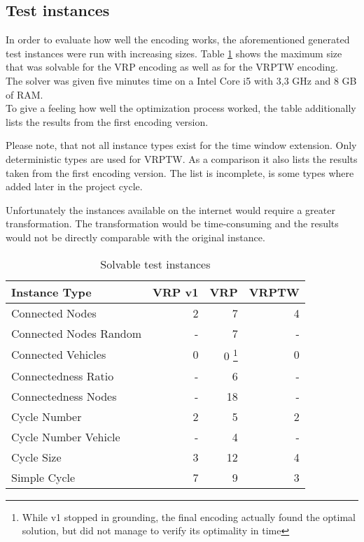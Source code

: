 \documentclass[12pt, letterpaper]{article}
\begin{document}
\subsection{Test instances}
In order to evaluate how well the encoding works, the aforementioned generated test instances were run with increasing sizes. Table \ref{table:benchmark} shows the maximum size that was solvable for the VRP encoding as well as for the VRPTW encoding.\\
The solver was given five minutes time on a Intel Core i5 with 3,3 GHz and 8 GB of RAM.\\
To give a feeling how well the optimization process worked, the table additionally lists the results from the first encoding version.

Please note, that not all instance types exist for the time window extension. Only deterministic types are used for VRPTW.
As a comparison it also lists the results taken from the first encoding version. The list is incomplete, is some types where added later in the project cycle.

Unfortunately the instances available on the internet would require a greater transformation. The transformation would be time-consuming and the results would not be directly comparable with the original instance.

\begin{table}
\begin{tabular}{l | r | r | r}
Instance Type			& VRP v1	& VRP	& VRPTW\\
\hline
Connected Nodes			& 2			& 7		& 4\\
Connected Nodes Random	& -			& 7		& -\\
Connected Vehicles		& 0			& 0 \footnote{While v1 stopped in grounding, the final encoding actually found the optimal solution, but did not manage to verify its optimality in time}	& 0\\
Connectedness Ratio		& -			& 6		& -\\
Connectedness Nodes		& -			& 18	& -\\
Cycle Number			& 2			& 5		& 2\\
Cycle Number Vehicle	& -			& 4		& -\\
Cycle Size				& 3 		& 12	& 4\\
Simple Cycle			& 7			& 9		& 3\\
\end{tabular}
\caption{Solvable test instances}
\label{table:benchmark}
\end{table}
\end{document}

